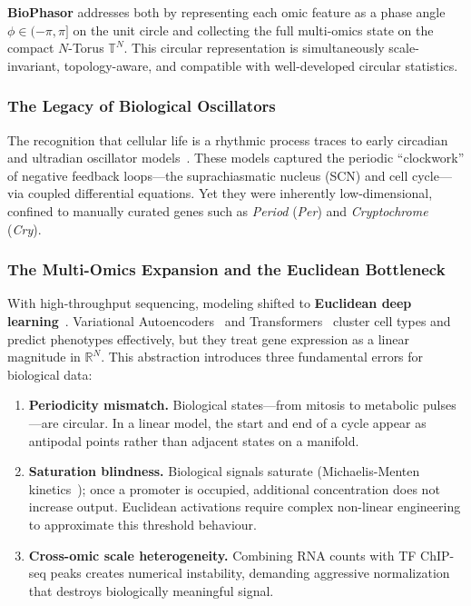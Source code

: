 \documentclass[preprint,12pt,amsmath,amssymb,superscriptaddress,floatfix]{revtex4-2}
\newcommand{\reals}{\mathbb{R}}
\begin{document}
\textbf{BioPhasor} addresses both by representing each omic feature as a
phase angle $\phi \in (-\pi,\pi]$ on the unit circle and collecting the full
multi-omics state on the compact $N$-Torus $\mathbb{T}^N$.
This circular representation is simultaneously scale-invariant, topology-aware,
and compatible with well-developed circular statistics.

\subsubsection{The Legacy of Biological Oscillators}

The recognition that cellular life is a rhythmic process traces to early
circadian and ultradian oscillator
models~\cite{goodwin1965oscillatory,goldbeter1995model}.
These models captured the periodic ``clockwork'' of negative feedback
loops---the suprachiasmatic nucleus (SCN) and cell cycle---via coupled
differential equations.
Yet they were inherently low-dimensional, confined to manually curated
genes such as \textit{Period} (\textit{Per}) and
\textit{Cryptochrome} (\textit{Cry}).

\subsubsection{The Multi-Omics Expansion and the Euclidean Bottleneck}

With high-throughput sequencing, modeling shifted to \textbf{Euclidean deep
learning}~\cite{ref_031,ref_032,ref_033,ref_034,ref_035,ref_036,ref_037,ref_038,ref_039,ref_040}.
Variational Autoencoders~\cite{kingma2013auto} and
Transformers~\cite{vaswani2017attention} cluster cell types and predict
phenotypes effectively, but they treat gene expression as a linear magnitude
in $\reals^N$.
This abstraction introduces three fundamental errors for biological data:

\begin{enumerate}
    \item \textbf{Periodicity mismatch.}
    Biological states---from mitosis to metabolic pulses---are circular.
    In a linear model, the start and end of a cycle appear as antipodal
    points rather than adjacent states on a manifold.

    \item \textbf{Saturation blindness.}
    Biological signals saturate (Michaelis-Menten kinetics~\cite{michaelis1913die});
    once a promoter is occupied, additional concentration does not increase
    output. Euclidean activations require complex non-linear engineering to
    approximate this threshold behaviour.

    \item \textbf{Cross-omic scale heterogeneity.}
    Combining RNA counts with TF ChIP-seq peaks creates numerical instability,
    demanding aggressive normalization that destroys biologically meaningful signal.
\end{enumerate}
\end{document}
